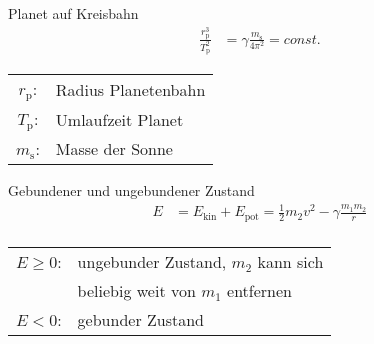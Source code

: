 \begin{karte}{Planet auf Kreisbahn}
    \begin{align*}
        \frac{r_\text{p}^3}{T_\text{p}^2} &= \gamma \frac{m_\text{s}}{4 \pi^2} = const.
    \end{align*}
    \begin{tabular}[t]{cl}
        \(r_\text{p}\): & Radius Planetenbahn \\
        \(T_\text{p}\): & Umlaufzeit Planet \\
        \(m_\text{s}\): & Masse der Sonne \\
    \end{tabular}
\end{karte}

\begin{karte}{Gebundener und ungebundener Zustand}
    \begin{align*}
        E &= E_\text{kin} + E_\text{pot} = \frac{1}{2} m_2 v^2  - \gamma\frac{m_1  m_2}{r}\\
    \end{align*}
    \begin{tabular}[t]{cl}
        \(E \ge 0\): & ungebunder Zustand, \(m_2\) kann sich  \\
            & beliebig weit von \(m_1\) entfernen\\
        \(E < 0\): & gebunder Zustand
    \end{tabular}
\end{karte}
